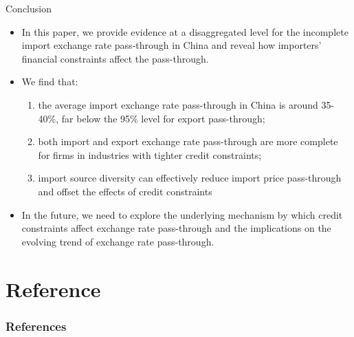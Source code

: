 \documentclass[10pt]{beamer}
\begin{document}
\begin{frame}{Conclusion}
	\begin{itemize}
		\item In this paper, we provide evidence at a disaggregated level for the incomplete import exchange rate pass-through in China and reveal how importers’ financial constraints affect the pass-through.
		\item We find that:
		\begin{enumerate}
			\item the average import exchange rate pass-through in China is around 35-40\%, far below the 95\% level for export pass-through;
			\item both import and export exchange rate pass-through are more complete for firms in industries with tighter credit constraints;
			\item import source diversity can effectively reduce import price pass-through and offset the effects of credit constraints
		\end{enumerate}
		\item In the future, we need to explore the underlying mechanism by which credit constraints affect exchange rate pass-through and the implications on the evolving trend of exchange rate pass-through. 
	\end{itemize}
\end{frame}


\section*{Reference}

\begin{frame}[allowframebreaks]
	\frametitle{References}
	
	\footnotesize
	
\end{frame}
	
\end{document}
